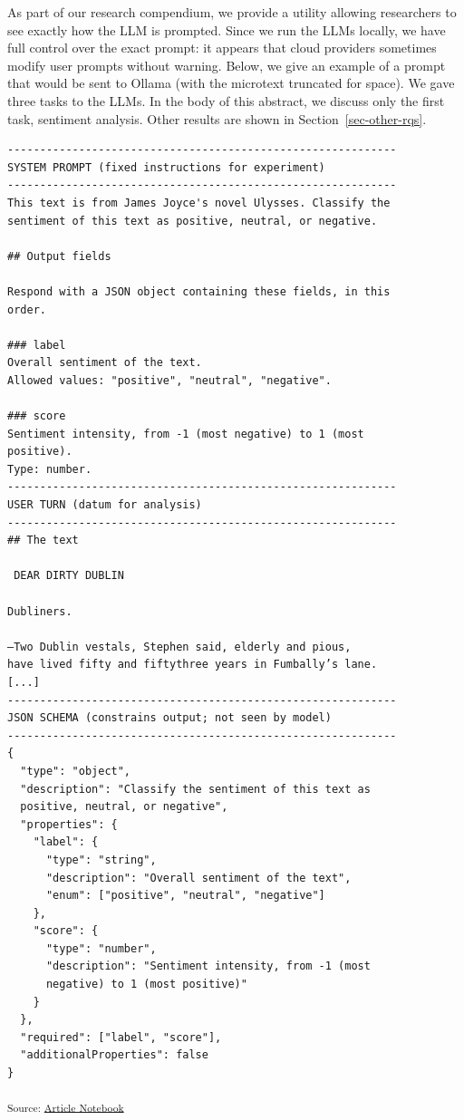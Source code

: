 \documentclass[
  letterpaper,
  DIV=11,
  numbers=noendperiod]{scrartcl}
\begin{document}
As part of our research compendium, we provide a utility allowing
researchers to see exactly how the LLM is prompted. Since we run the
LLMs locally, we have full control over the exact prompt: it appears
that cloud providers sometimes modify user prompts without warning.
Below, we give an example of a prompt that would be sent to Ollama (with
the microtext truncated for space). We gave three tasks to the LLMs. In
the body of this abstract, we discuss only the first task, sentiment
analysis. Other results are shown in Section~\ref{sec-other-rqs}.

\begin{verbatim}
------------------------------------------------------------
SYSTEM PROMPT (fixed instructions for experiment)
------------------------------------------------------------
This text is from James Joyce's novel Ulysses. Classify the
sentiment of this text as positive, neutral, or negative.

## Output fields

Respond with a JSON object containing these fields, in this
order.

### label
Overall sentiment of the text.
Allowed values: "positive", "neutral", "negative".

### score
Sentiment intensity, from -1 (most negative) to 1 (most
positive).
Type: number.
------------------------------------------------------------
USER TURN (datum for analysis)
------------------------------------------------------------
## The text

 DEAR DIRTY DUBLIN

Dubliners.

—Two Dublin vestals, Stephen said, elderly and pious,
have lived fifty and fiftythree years in Fumbally’s lane.
[...]
------------------------------------------------------------
JSON SCHEMA (constrains output; not seen by model)
------------------------------------------------------------
{
  "type": "object",
  "description": "Classify the sentiment of this text as
  positive, neutral, or negative",
  "properties": {
    "label": {
      "type": "string",
      "description": "Overall sentiment of the text",
      "enum": ["positive", "neutral", "negative"]
    },
    "score": {
      "type": "number",
      "description": "Sentiment intensity, from -1 (most
      negative) to 1 (most positive)"
    }
  },
  "required": ["label", "score"],
  "additionalProperties": false
}
\end{verbatim}

\textsubscript{Source:
\href{https://uom-digital-studies.github.io/aeolus-microtexts/index.qmd.html}{Article
Notebook}}
\end{document}
